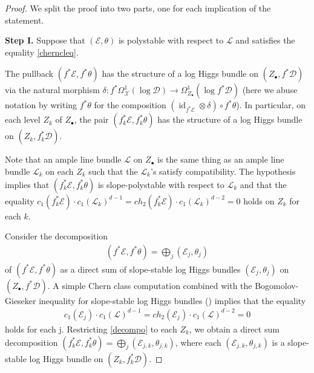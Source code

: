 \documentclass[a4paper]{amsart}
\theoremstyle{definition}
\def\id{\mathop{\mathrm{id}}\nolimits}
\begin{document}
\begin{proof}
We split the proof into two parts, one for each implication of the statement. 

\textbf{Step I.} Suppose that $(\mathcal{E},\theta)$ is polystable with respect to $\mathcal{L}$ and satisfies the equality \ref{cherncleq}.

The pullback $(f^*\mathcal{E},f^*\theta)$ has the structure of a log Higgs bundle on $(Z_\bullet,f^*\mathscr{D})$ via the natural morphism $\delta:f^*\Omega^1_{\mathscr{X}}(\log\mathscr{D})\to\Omega^1_{Z_\bullet}(\log f^*\mathscr{D})$ (here we abuse notation by writing $f^*\theta$ for the composition $(\id_{f^*\mathcal{E}}\otimes\delta)\circ f^*\theta$). In particular, on each level $Z_k$ of $Z_\bullet$, the pair $(f_k^*\mathcal{E},f_k^*\theta)$ has the structure of a log Higgs bundle on $(Z_k,f_k^*\mathscr{D})$. 

Note that an ample line bundle $\mathcal{L}$ on $Z_\bullet$ is the same thing as an ample line bundle $\mathcal{L}_k$ on each $Z_k$ such that the $\mathcal{L}_k$'s satisfy compatibility. The hypothesis implies that $(f_k^*\mathcal{E},f_k^*\theta)$ is slope-polystable with respect to $\mathcal{L}_k$ and that the equality $c_1(f_k^*\mathcal{E})\cdot c_1(\mathcal{L}_k)^{d-1}=ch_2(f_k^*\mathcal{E})\cdot c_1(\mathcal{L}_k)^{d-2}=0$ holds on $Z_k$ for each $k$.

Consider the decomposition 
\begin{align}\label{decompo}
(f^*\mathcal{E},f^*\theta)=\bigoplus_j(\mathcal{E}_j,\theta_j)
\end{align}
of $(f^*\mathcal{E},f^*\theta)$ as a direct sum of slope-stable log Higgs bundles $(\mathcal{E}_j,\theta_j)$ on $(Z_\bullet,f^*\mathscr{D})$. A simple Chern class computation combined with the Bogomolov-Gieseker inequality for slope-stable log Higgs bundles (\cite[Theorem 6.5]{mochizuki_asterisque}) implies that the equality
\begin{align}\label{cherneq}
c_1(\mathcal{E}_j)\cdot c_1(\mathcal{L})^{d-1}=ch_2(\mathcal{E}_j)\cdot c_1(\mathcal{L})^{d-2}=0
\end{align}
holds for each j. Restricting \ref{decompo} to each $Z_k$, we obtain a direct sum decomposition $(f_k^*\mathcal{E},f_k^*\theta)=\bigoplus_{j}(\mathcal{E}_{j,k},\theta_{j,k})$, where each $(\mathcal{E}_{j,k},\theta_{j,k})$ is a slope-stable log Higgs bundle on $(Z_k,f_k^*\mathscr{D})$. 


\end{proof}
\end{document}
